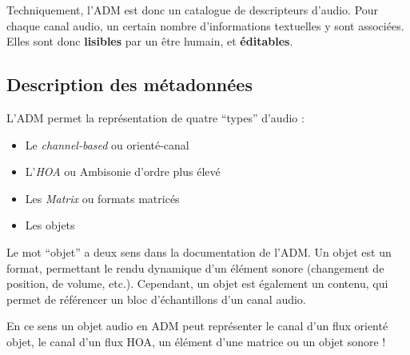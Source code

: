 \documentclass[
  letterpaper,
  DIV=11,
  numbers=noendperiod]{scrreprt}
\providecommand{\tightlist}{%
  \setlength{\itemsep}{0pt}\setlength{\parskip}{0pt}}\usepackage{longtable,booktabs,array}
\begin{document}
Techniquement, l'ADM est donc un catalogue de descripteurs d'audio. Pour
chaque canal audio, un certain nombre d'informations textuelles y sont
associées. Elles sont donc \textbf{lisibles} par un être humain, et
\textbf{éditables}.

\hypertarget{description-des-muxe9tadonnuxe9es}{%
\subsection{Description des
métadonnées}\label{description-des-muxe9tadonnuxe9es}}

L'ADM permet la représentation de quatre ``types'' d'audio :

\begin{itemize}
\tightlist
\item
  Le \emph{channel-based} ou orienté-canal
\item
  L'\emph{HOA} ou Ambisonie d'ordre plus élevé
\item
  Les \emph{Matrix} ou formats matricés
\item
  Les objets
\end{itemize}

\begin{tcolorbox}[enhanced jigsaw, leftrule=.75mm, arc=.35mm, bottomtitle=1mm, colback=white, colbacktitle=quarto-callout-warning-color!10!white, opacityback=0, left=2mm, rightrule=.15mm, opacitybacktitle=0.6, breakable, toptitle=1mm, titlerule=0mm, bottomrule=.15mm, toprule=.15mm, coltitle=black, title=\textcolor{quarto-callout-warning-color}{\faExclamationTriangle}\hspace{0.5em}{Avertissement}]

Le mot ``objet'' a deux sens dans la documentation de l'ADM. Un objet
est un format, permettant le rendu dynamique d'un élément sonore
(changement de position, de volume, etc.). Cependant, un objet est
également un contenu, qui permet de référencer un bloc d'échantillons
d'un canal audio.

En ce sens un objet audio en ADM peut représenter le canal d'un flux
orienté objet, le canal d'un flux HOA, un élément d'une matrice ou un
objet sonore !

\end{tcolorbox}
\end{document}
